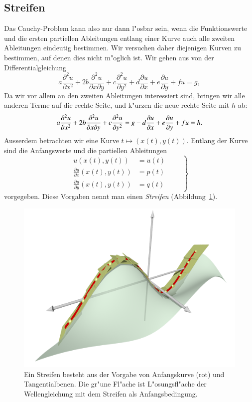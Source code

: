 \subsection{Streifen}
Das Cauchy-Problem kann also nur dann l"osbar sein, wenn die Funktionswerte
und die ersten partiellen Ableitungen entlang einer Kurve
auch alle zweiten Ableitungen eindeutig bestimmen.
Wir versuchen daher
diejenigen Kurven zu bestimmen, auf denen dies nicht m"oglich ist.
Wir gehen aus von der Differentialgleichung
\begin{equation}
a\frac{\partial^2 u}{\partial x^2}
+
2b\frac{\partial^2 u}{\partial x\partial y}
+
c\frac{\partial^2 u}{\partial y^2}
+
d\frac{\partial u}{\partial x}
+
e\frac{\partial u}{\partial y}
+
fu
=g,
\label{charequation}
\end{equation}
Da wir vor allem an den zweiten Ableitungen interessiert sind, bringen
wir alle anderen Terme auf die rechte Seite, und k"urzen die neue
rechte Seite mit $h$ ab:
\begin{equation}
a\frac{\partial^2 u}{\partial x^2}
+
2b\frac{\partial^2 u}{\partial x\partial y}
+
c\frac{\partial^2 u}{\partial y^2}
=
g
-
d\frac{\partial u}{\partial x}
+
e\frac{\partial u}{\partial y}
+
fu
=h.
\notag
\end{equation}
Ausserdem betrachten wir eine Kurve
$t\mapsto(x(t),y(t))$.
Entlang der Kurve sind die Anfangswerte
und die partiellen Ableitungen
\begin{equation}
\left.
\begin{aligned}
u(x(t),y(t))&=u(t)\\
\frac{\partial u}{\partial x}(x(t),y(t)) &= p(t)\\
\frac{\partial u}{\partial y}(x(t),y(t)) &= q(t)
\end{aligned}
\qquad
\right\}
\label{charanfangs}
\end{equation}
vorgegeben. Diese Vorgaben nennt man einen {\em Streifen}
(Abbildung~\ref{skript:streifen}).

\begin{figure}
\centering
\includegraphics[width=\hsize]{../common/3d/streifen0.png}
\caption{Ein Streifen besteht aus der Vorgabe von Anfangskurve (rot)
und Tangentialbenen.
Die gr"une Fl"ache ist L"osungsfl"ache der Wellengleichung mit 
dem Streifen als Anfangsbedingung.
\label{skript:streifen}}
\end{figure}

